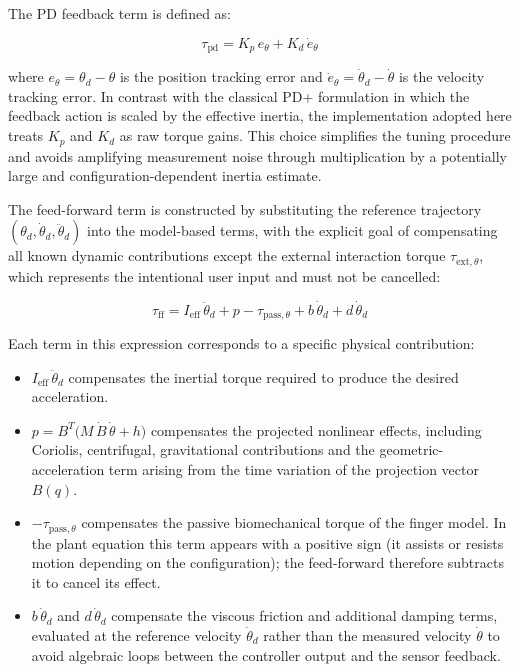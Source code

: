 The PD feedback term is defined as:

\begin{equation}
    \tau_{\mathrm{pd}} = K_p\,e_\theta + K_d\,\dot e_\theta
\end{equation}

where $e_\theta = \theta_d - \theta$ is the position tracking error and $\dot e_\theta = \dot\theta_d - \dot\theta$ is the velocity tracking error. In contrast with the classical PD+ formulation in which the feedback action is scaled by the effective inertia, the implementation adopted here treats $K_p$ and $K_d$ as raw torque gains. This choice simplifies the tuning procedure and avoids amplifying measurement noise through multiplication by a potentially large and configuration-dependent inertia estimate.
 
The feed-forward term is constructed by substituting the reference trajectory $(\theta_d, \dot\theta_d, \ddot\theta_d)$ into the model-based terms, with the explicit goal of compensating all known dynamic contributions except the external interaction torque $\tau_{\mathrm{ext},\theta}$, which represents the intentional user input and must not be cancelled:

\begin{equation}
    \tau_{\mathrm{ff}}
  = I_{\mathrm{eff}}\,\ddot\theta_d
    + p
    - \tau_{\mathrm{pass},\theta}
    + b\,\dot\theta_d
    + d\,\dot\theta_d
\end{equation}

Each term in this expression corresponds to a specific physical contribution:

\begin{itemize}
    \item $I_{\mathrm{eff}}\,\ddot\theta_d$ compensates the inertial torque required to produce the desired acceleration.
    \item $p = B^T\!\bigl(M\,\dot B\,\dot\theta + h\bigr)$ compensates the projected nonlinear effects, including Coriolis, centrifugal, gravitational contributions and the geometric-acceleration term arising from the time variation of the projection vector $B(q)$.
    \item $-\tau_{\mathrm{pass},\theta}$ compensates the passive biomechanical torque of the finger model. In the plant equation this term appears with a positive sign (it assists or resists motion depending on the configuration); the feed-forward therefore subtracts it to cancel its effect.
    \item $b\,\dot\theta_d$ and $d\,\dot\theta_d$ compensate the viscous friction and additional damping terms, evaluated at the reference velocity $\dot\theta_d$ rather than the measured velocity $\dot\theta$ to avoid algebraic loops between the controller output and the sensor feedback.
\end{itemize}

